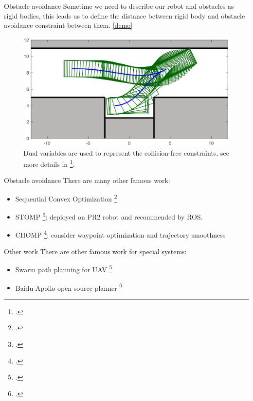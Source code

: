 \documentclass{beamer}
\begin{document}
\begin{frame}{Obstacle avoidance}
	Sometime we need to describe our robot and obstacles as rigid bodies, this leads us to define the distance between rigid body and obstacle avoidance constraint between them. \href{https://raw.githubusercontent.com/XiaojingGeorgeZhang/OBCA/master/images/TrajBack_ParkingVideo.gif}{[demo]}
	\begin{figure}
		\includegraphics[width=0.5\linewidth]{figures/parallel-parking.png}
		\caption{Dual variables are used to represent the collision-free constraints, see more details in \footcite{zhang2017optimization}.}
	\end{figure}
\end{frame}

\begin{frame}{Obstacle avoidance}
	There are many other famous work:
	\begin{itemize}
		\item Sequential Convex Optimization \footcite{schulman2014motion}
		\item STOMP \footcite{kalakrishnan2011stomp}: deployed on PR2 robot and recommended by ROS. 
		\item CHOMP \footcite{zucker2013chomp}: consider waypoint optimization and trajectory smoothness 
	\end{itemize}
\end{frame}

\begin{frame}{Other work}
	There are other famous work for special systems:
	\begin{itemize}
		\item Swarm path planning for UAV \footcite{roberge2012comparison}
		\item Baidu Apollo open source planner \footcite{fan2018baidu}
	\end{itemize}
\end{frame}
\end{document}
